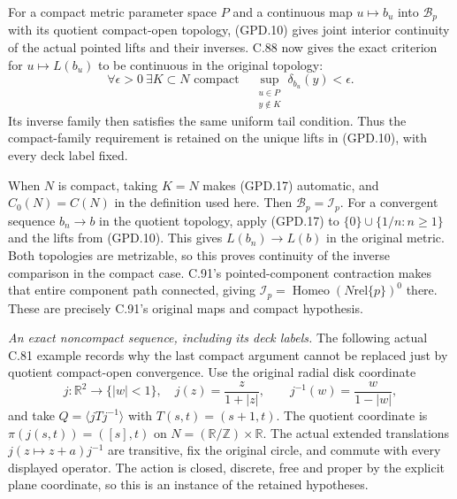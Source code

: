 For a compact metric parameter space $P$ and a continuous
map $u\mapsto b_u$ into $\mathscr B_p$ with its quotient
compact-open topology, (GPD.10) gives joint interior continuity
of the actual pointed lifts and their inverses. C.88 now gives
the exact criterion for $u\mapsto L(b_u)$ to be continuous
in the original topology:
\[
 \forall\epsilon>0\ \exists K\subset N\text{ compact}\quad
 \sup_{\substack{u\in P\\y\notin K}}\delta_{b_u}(y)<\epsilon .
                                                               \tag{GPD.17}
\]
Its inverse family then satisfies the same uniform tail
condition. Thus the compact-family requirement is retained
on the unique lifts in (GPD.10), with every deck label fixed.

When $N$ is compact, taking $K=N$ makes (GPD.17) automatic,
and $C_0(N)=C(N)$ in the definition used here.
Then $\mathscr B_p=\mathscr I_p$.
For a convergent sequence $b_n\to b$ in the quotient topology,
apply (GPD.17) to $\{0\}\cup\{1/n:n\geq1\}$ and the lifts from
(GPD.10). This gives $L(b_n)\to L(b)$ in the original metric.
Both topologies are metrizable, so this proves continuity
of the inverse comparison in the compact case.
C.91's pointed-component contraction makes that entire
component path connected, giving
$\mathscr I_p=\operatorname{Homeo}(N\mathbin{\mathrm{rel}}\{p\})^0$
there. These are precisely C.91's original maps and compact
hypothesis.

\emph{An exact noncompact sequence, including its deck labels.}
The following actual C.81 example records why the last compact
argument cannot be replaced just by quotient compact-open
convergence. Use the original radial disk coordinate
\[
 j:\mathbb R^2\to\{|w|<1\},\quad j(z)=\frac{z}{1+|z|},
 \qquad j^{-1}(w)=\frac{w}{1-|w|},
                                                               \tag{GPD.18}
\]
and take $Q=\langle jTj^{-1}\rangle$ with
$T(s,t)=(s+1,t)$. The quotient coordinate is
$\pi(j(s,t))=([s],t)$ on $N=(\mathbb R/\mathbb Z)\times\mathbb R$.
The actual extended translations $j(z\mapsto z+a)j^{-1}$
are transitive, fix the original circle, and commute with
every displayed operator. The action is closed, discrete,
free and proper by the explicit plane coordinate, so this
is an instance of the retained hypotheses.

